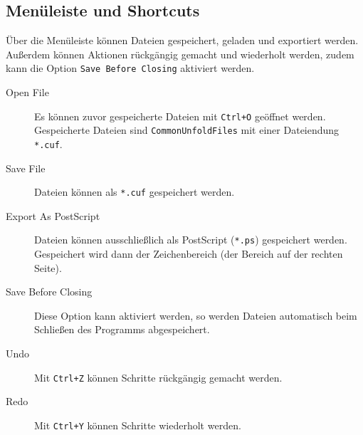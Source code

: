 \subsection{Menüleiste und Shortcuts}
\label{subsec:dateioperationen}

Über die Menüleiste können Dateien gespeichert, geladen und exportiert werden. Außerdem können Aktionen rückgängig gemacht und wiederholt werden, zudem kann die Option \texttt{Save Before Closing} aktiviert werden.

\begin{description}
  \item [Open File] Es können zuvor gespeicherte Dateien mit \texttt{Ctrl+O} geöffnet werden. Gespeicherte Dateien sind \texttt{CommonUnfoldFiles} mit einer Dateiendung \texttt{*.cuf}.
  \item [Save File] Dateien können als \texttt{*.cuf} gespeichert werden.
  \item [Export As PostScript] Dateien können ausschließlich als PostScript (\texttt{*.ps}) gespeichert werden. Gespeichert wird dann der Zeichenbereich (der Bereich auf der rechten Seite).
  \item [Save Before Closing] Diese Option kann aktiviert werden, so werden Dateien automatisch beim Schließen des Programms abgespeichert.
  \item [Undo] Mit \texttt{Ctrl+Z} können Schritte rückgängig gemacht werden.
  \item [Redo] Mit \texttt{Ctrl+Y} können Schritte wiederholt werden. 
\end{description}